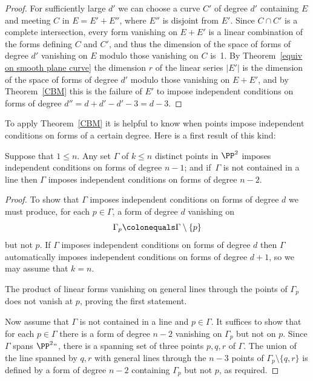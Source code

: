 \begin{proof}
For sufficiently large $d'$ we can choose a curve $C'$ of degree $d'$ containing
$E$ and meeting $C$ in $E = E'+E''$, where $E''$ is disjoint from $E'$. Since $C\cap C'$
is a complete intersection, every form vanishing on $E+E'$ is a linear combination of
the forms defining $C$ and $C'$, and thus the dimension of the space of forms of degree $d'$
vanishing on $E$ modulo those vanishing on $C$ is~1. By
Theorem~\ref{equiv on smooth plane curve} the dimension $r$ of the
linear series $|E'|$ is the dimension of the space of
forms of degree $d'$ modulo those vanishing on $E+E'$, and by Theorem~\ref{CBM} this
is the failure of $E'$ to impose independent conditions on forms of degree
$d'' = d+d' - d' -3 = d-3$.
\unif
\end{proof}

To apply Theorem~\ref{CBM} it is helpful to know when points impose independent conditions on forms of a certain degree. Here is a first result of this kind:
%

\begin{proposition}\label{n-2 independence}
Suppose that $1\leq n$. Any set $\Gamma$ of $k\leq n$ distinct points
in $\PP^{2}$ imposes independent conditions on forms of degree $n-1$;
and if $\,\Gamma$ is not contained in a line then $\Gamma$ imposes
independent conditions on forms of degree $n-2$.
\unif
\end{proposition}

\begin{proof} To show that $\Gamma$ imposes independent conditions on forms of degree $d$ we must produce, for each $p\in \Gamma$, a form of degree $d$ vanishing on
$$
\Gamma_{p}\colonequals\Gamma\setminus\{p\}
$$
 but not $p$. If $\Gamma$ imposes independent conditions on forms of degree $d$ then
 $\Gamma$ automatically imposes independent conditions on forms of degree $d+1$,
 so we may assume that $k=n$.

The product of linear forms
 vanishing on general lines through the points of $\Gamma_{p}$ does not vanish at $p$, proving the first statement.

Now assume that $\Gamma$ is not contained in a line and $p\in \Gamma$.
It suffices to show that for each $p\in \Gamma$ there is a form of
degree $n-2$ vanishing on $\Gamma_{p}$ but not on $p$. Since $\Gamma$
spans $\PP^2` `$, there is a spanning set of three points $p,q,r$ of
$\Gamma$. The union of the line spanned by $q,r$ with general lines
through the $n-3$ points of $\Gamma_{p}\setminus\{q,r\}$ is defined by a form of degree $n-2$ containing $\Gamma_{p}$ but not $p$,
as required.
\end{proof}

